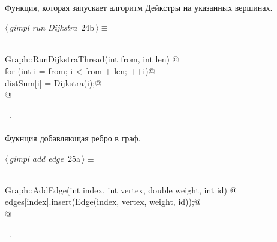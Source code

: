 \documentclass[12pt]{article}
\begin{document}
\paragraph{}
Функция, которая запускает алгоритм Дейкстры на указанных вершинах.
\begin{flushleft} \small
\begin{minipage}{\linewidth}\label{scrap39}\raggedright\small
{} $\langle\,${\itshape gimpl run Dijkstra}\nobreak\ {\footnotesize {24b}}$\,\rangle\equiv$
\vspace{-1ex}
\begin{list}{}{} \item
\mbox{}\verb@@\\
\mbox{}\verb@void Graph::RunDijkstraThread(int from, int len) {@\\
\mbox{}\verb@    for (int i = from; i < from + len; ++i)@\\
\mbox{}\verb@        distSum[i] = Dijkstra(i);@\\
\mbox{}\verb@}@\\
\mbox{}\verb@@{\NWsep}
\end{list}
\vspace{-1.5ex}
\footnotesize
\begin{list}{}{\setlength{\itemsep}{-\parsep}\setlength{\itemindent}{-\leftmargin}}
\item \NWtxtMacroRefIn\ .

\item{}
\end{list}
\end{minipage}\vspace{4ex}
\end{flushleft}
\paragraph{}
Фукнция добавляющая ребро в граф.
\begin{flushleft} \small
\begin{minipage}{\linewidth}\label{scrap40}\raggedright\small
{} $\langle\,${\itshape gimpl add edge}\nobreak\ {\footnotesize {25a}}$\,\rangle\equiv$
\vspace{-1ex}
\begin{list}{}{} \item
\mbox{}\verb@@\\
\mbox{}\verb@void Graph::AddEdge(int index, int vertex, double weight, int id) {@\\
\mbox{}\verb@    edges[index].insert(Edge(index, vertex, weight, id));@\\
\mbox{}\verb@}@\\
\mbox{}\verb@@{\NWsep}
\end{list}
\vspace{-1.5ex}
\footnotesize
\begin{list}{}{\setlength{\itemsep}{-\parsep}\setlength{\itemindent}{-\leftmargin}}
\item \NWtxtMacroRefIn\ .

\item{}
\end{list}
\end{minipage}\vspace{4ex}
\end{flushleft}
\end{document}
